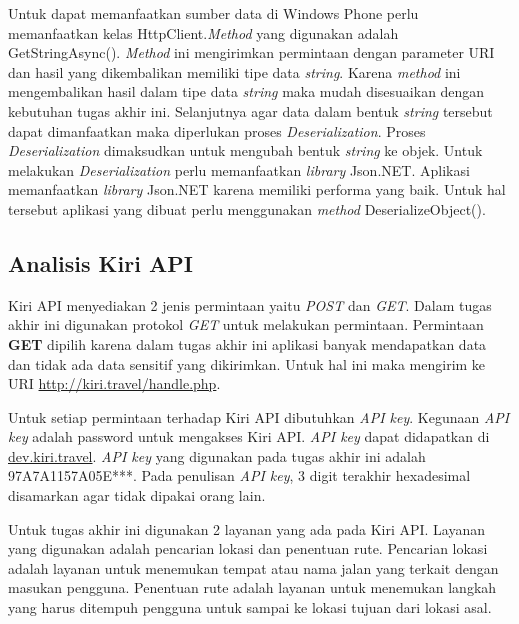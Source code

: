 Untuk dapat memanfaatkan sumber data di Windows Phone perlu memanfaatkan kelas HttpClient.\textit{Method} yang digunakan adalah GetStringAsync(). \textit{Method} ini mengirimkan permintaan dengan parameter URI dan hasil yang dikembalikan memiliki tipe data \textit{string}. Karena \textit{method} ini mengembalikan hasil dalam tipe data \textit{string} maka mudah disesuaikan dengan kebutuhan tugas akhir ini. Selanjutnya agar data dalam bentuk \textit{string} tersebut dapat dimanfaatkan maka diperlukan proses \textit{Deserialization}. Proses \textit{Deserialization} dimaksudkan untuk mengubah bentuk \textit{string} ke objek. Untuk melakukan \textit{Deserialization} perlu memanfaatkan \textit{library} Json.NET. Aplikasi memanfaatkan \textit{library} Json.NET karena memiliki performa yang baik. Untuk hal tersebut aplikasi yang dibuat perlu menggunakan \textit{method} DeserializeObject().

\subsection{Analisis Kiri API}
\label{lab:Analisis Kiri API}
\hspace{0.5cm} Kiri API menyediakan 2 jenis permintaan yaitu \textit{POST} dan \textit{GET}. Dalam tugas akhir ini digunakan protokol \textit{GET} untuk melakukan permintaan. Permintaan \textbf{GET} dipilih karena dalam tugas akhir ini aplikasi banyak mendapatkan data dan tidak ada data sensitif yang dikirimkan. Untuk hal ini maka mengirim ke URI \url{http://kiri.travel/handle.php}.

Untuk setiap permintaan terhadap Kiri API dibutuhkan \textit{API key}. Kegunaan \textit{API key} adalah password untuk mengakses Kiri API. \textit{API key} dapat didapatkan di \url{dev.kiri.travel}. \textit{API key} yang digunakan pada tugas akhir ini adalah 97A7A1157A05E***. Pada penulisan \textit{API key}, 3 digit terakhir hexadesimal disamarkan agar tidak dipakai orang lain.   %
     
Untuk tugas akhir ini digunakan 2 layanan yang ada pada Kiri API. Layanan yang digunakan adalah pencarian lokasi dan penentuan rute. Pencarian lokasi adalah layanan untuk menemukan tempat atau nama jalan yang terkait dengan masukan pengguna. Penentuan rute adalah layanan untuk menemukan langkah yang harus ditempuh pengguna untuk sampai ke lokasi tujuan dari lokasi asal. 

